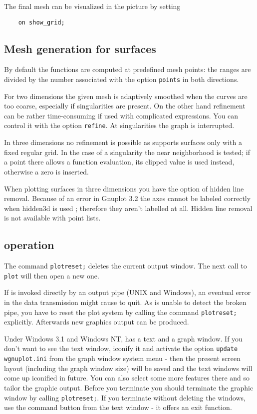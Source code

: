 The final mesh can be visualized in the picture by setting
\begin{verbatim}
    on show_grid;
\end{verbatim}


\subsection{Mesh generation for surfaces}

By default the functions are computed at predefined mesh points: the ranges are
divided by the number associated with the option \texttt{points} in both
directions.

For two dimensions the given mesh is adaptively smoothed when the curves are too
coarse, especially if singularities are present. On the other hand refinement
can be rather time-consuming if used with complicated expressions. You can
control it with the option \texttt{refine}.  At singularities the graph is
interrupted.

In three dimensions no refinement is possible as {\Gnuplot} supports surfaces only
with a fixed regular grid. In the case of a singularity the near neighborhood is
tested; if a point there allows a function evaluation, its clipped value is used
instead, otherwise a zero is inserted.

When plotting surfaces in three dimensions you have the option of hidden line
removal. Because of an error in Gnuplot 3.2 the axes cannot be labeled correctly
when hidden3d is used ; therefore they aren't labelled at all.  Hidden line
removal is not available with point lists.


\subsection{{\Gnuplot} operation}
\hypertarget{command:PLOTRESET}{}

The command \texttt{plotreset;} deletes the current {\Gnuplot} output
window. The next call to \texttt{plot} will then open a new one.

If {\Gnuplot} is invoked directly by an output pipe (UNIX and Windows), an eventual
error in the {\Gnuplot} data transmission might cause {\Gnuplot} to quit. As {\REDUCE}
is unable to detect the broken pipe, you have to reset the plot system by
calling the command \texttt{plotreset;} explicitly. Afterwards new graphics
output can be produced.

Under Windows 3.1 and Windows NT, {\Gnuplot} has a text and a graph window.  If you
don't want to see the text window, iconify it and activate the
option \texttt{update wgnuplot.ini} from the graph window system menu - then the
present screen layout (including the graph window size) will be saved and the
text windows will come up iconified in future.  You can also select some more
features there and so tailor the graphic output.  Before you terminate {\REDUCE}
you should terminate the graphic window by calling \texttt{plotreset;}.  If you
terminate {\REDUCE} without deleting the {\Gnuplot} windows, use the command button
from the {\Gnuplot} text window - it offers an exit function.


